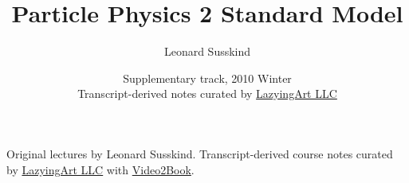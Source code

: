 \documentclass[11pt,oneside]{book}
\begin{document}
\frontmatter
\title{Particle Physics 2 Standard Model}
\author{Leonard Susskind}
\date{Supplementary track, 2010 Winter \\ Transcript-derived notes curated by \href{https://lazying.art}{LazyingArt LLC}}
\maketitle
\begin{center}
\small Original lectures by Leonard Susskind. Transcript-derived course notes curated by \href{https://lazying.art}{LazyingArt LLC} with \href{https://github.com/lachlanchen/Video2Book}{Video2Book}.
\end{center}
\clearpage
\tableofcontents
\mainmatter










\end{document}
